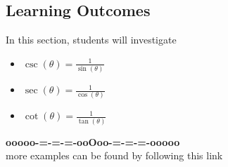 \documentclass{ximera}
\begin{document}
\subsection*{Learning Outcomes}

\begin{sectionOutcomes}
In this section, students will investigate

\begin{itemize}
\item $\csc(\theta) = \frac{1}{\sin(\theta)}$
\item $\sec(\theta) = \frac{1}{\cos(\theta)}$
\item $\cot(\theta) = \frac{1}{\tan(\theta)}$
\end{itemize}
\end{sectionOutcomes}













\begin{center}
\textbf{\textcolor{green!50!black}{ooooo-=-=-=-ooOoo-=-=-=-ooooo}} \\

more examples can be found by following this link\\ 

\end{center}
\end{document}
